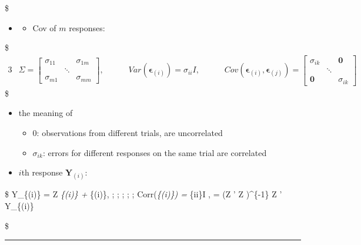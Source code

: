 \documentclass[
]{book}
\providecommand{\tightlist}{%
  \setlength{\itemsep}{0pt}\setlength{\parskip}{0pt}}
\begin{document}
{{\$

\begin{itemize}
\item
  \begin{itemize}
  \tightlist
  \item
    Cov of \(m\) responses:
  \end{itemize}
\end{itemize}

\$
\begin{alignat*}{3}

&\Sigma = \begin{bmatrix} \sigma_{11} & & \sigma_{1m} \\ & \ddots & \\ \sigma_{m1}&& \sigma_{mm} \end{bmatrix}, \; \; \; \; \; 

&&Var(\pmb \epsilon_{(i)}) = \sigma_{ii} I,\; \; \; \; \; 

&&Cov(\pmb \epsilon_{(i)}, \pmb \epsilon_{(j)}) = \begin{bmatrix} \sigma_{ik} & & \pmb 0 \\ & \ddots & \\ \pmb 0 && \sigma_{ik} \end{bmatrix}

\end{alignat*}
\$

\begin{itemize}
\tightlist
\item
  the meaning of

  \begin{itemize}
  \tightlist
  \item
    \(0\): observations from different trials, are uncorrelated
  \item
    \(\sigma_{ik}\): errors for different responses on the same trial are correlated
  \end{itemize}
\item
  \(i\)th response \(\pmb Y_{(i)}\):
\end{itemize}

\$
\pmb Y\_\{(i)\} = \pmb Z \pmb \beta\emph{\{(i)\} + \epsilon}\{(i)\}, ; ; ; ; ;  Corr(\epsilon\emph{\{(i)\}) = \sigma}\{ii\}I ,  = (\pmb Z ' \pmb Z )\^{}\{-1\} \pmb Z ' \pmb Y\_\{(i)\}

\$

\begin{center}\rule{0.5\linewidth}{0.5pt}\end{center}

}}
\end{document}
